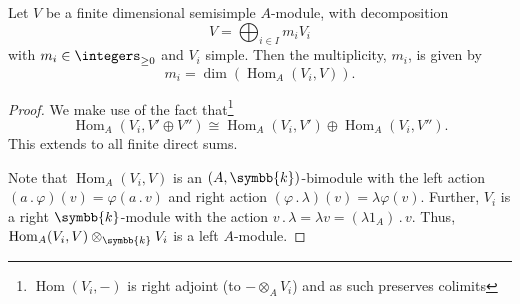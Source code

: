 \documentclass[fleqn]{NotesClass}
\renewcommand{\field}{\symbb{k}}
\DeclareMathOperator{\Hom}{Hom}
\newcommand{\action}{\mathbin{.}}
\newcommand{\isomorphic}{\cong}
\begin{document}
    \begin{lma}{}{}
        Let \(V\) be a finite dimensional semisimple \(A\)-module, with decomposition
        \begin{equation}
            V = \bigoplus_{i \in I} m_i V_i
        \end{equation}
        with \(m_i \in \integers_{\ge 0}\) and \(V_i\) simple.
        Then the multiplicity, \(m_i\), is given by
        \begin{equation}
            m_i = \dim( \Hom_A(V_i, V) ).
        \end{equation}
        \begin{proof}
            We make use of the fact that\footnote{\(\Hom(V_i, -)\) is right adjoint (to \(-\otimes_AV_i\)) and as such preserves colimits}
            \begin{equation}
                \Hom_A(V_i, V' \oplus V'') \isomorphic \Hom_A(V_i, V') \oplus \Hom_A(V_i, V'').
            \end{equation}
            This extends to all finite direct sums.
            
            Note that \(\Hom_A(V_i, V)\) is an \((A, \field)\)-bimodule with the left action \((a \action \varphi)(v) = \varphi(a \action v)\) and right action \((\varphi \action \lambda)(v) = \lambda \varphi(v)\).
            Further, \(V_i\) is a right \(\field\)-module with the action \(v \action \lambda = \lambda v = (\lambda 1_A) \action v\).
            Thus, \(\Hom_A(V_i, V) \otimes_{\field} V_i\) is a left \(A\)-module.
            

\end{proof}
\end{lma}
\end{document}
